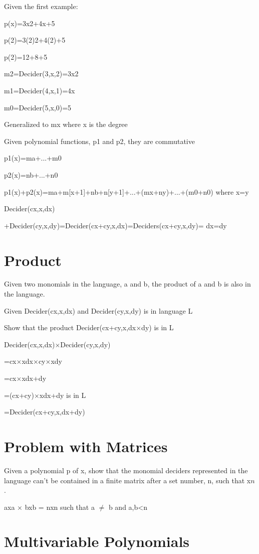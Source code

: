 Given the first example:

p(x)=3x2+4x+5

p(2)=3(2)2+4(2)+5

p(2)=12+8+5


m2=Decider(3,x,2)=3x2

m1=Decider(4,x,1)=4x

m0=Decider(5,x,0)=5


Generalized to mx where x is the degree

Given polynomial functions, p1 and p2, they are commutative

p1(x)=ma+...+m0

p2(x)=nb+...+n0

p1(x)+p2(x)=ma+m[x+1]+nb+n[y+1]+...+(mx+ny)+...+(m0+n0) where x=y

Decider(cx,x,dx)

+Decider(cy,x,dy)=Decider(cx+cy,x,dx)=Deciders(cx+cy,x,dy)= dx=dy

\section{Product}

Given two monomials in the language, a and b, the product of a and b is also in the language.

Given Decider(cx,x,dx) and Decider(cy,x,dy) is in language L

Show that the product Decider(cx+cy,x,dx$\times $dy) is in L

Decider(cx,x,dx)$\times $Decider(cy,x,dy)

=cx$\times $xdx$\times $cy$\times $xdy

=cx$\times $xdx+dy

=(cx+cy)$\times $xdx+dy is in L

=Decider(cx+cy,x,dx+dy)

\section{Problem with Matrices}


Given a polynomial p of x, show that the monomial deciders represented in the language can't be contained in a finite matrix after a set number, n, such that x$n$.

axa $\times $ bxb = nxn such that a $\neq $ b and a,b<n

\section{Multivariable Polynomials}

